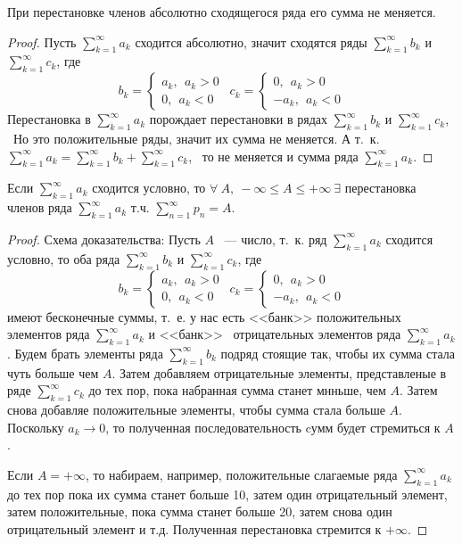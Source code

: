 \documentclass[../../main.tex]{subfiles}
\begin{document}
\begin{crl*}
	При перестановке членов абсолютно сходящегося ряда его сумма не меняется.
\end{crl*}
\begin{proof}
		Пусть $\sum\limits_{k = 1}^{\infty} a_k$ сходится абсолютно,
		значит сходятся ряды $\sum\limits_{k = 1}^{\infty} b_k$ и
		$\sum\limits_{k = 1}^{\infty} c_k$, где\[b_k = \begin{cases}
			a_k, \ \ a_k > 0\\
			0, \ \ a_k < 0
		  \end{cases} \ \
		 c_k = \begin{cases}
			0, \ \ a_k > 0\\
			-a_k, \ \ a_k < 0
		  \end{cases}\]
  Перестановка в $\sum\limits_{k = 1}^{\infty} a_k$ порождает перестановки
  в рядах  $\sum\limits_{k = 1}^{\infty} b_k$ и
  $\sum\limits_{k = 1}^{\infty} c_k$, \ Но это положительные ряды,
  значит их сумма не меняется. А т.~к. $\sum\limits_{k = 1}^{\infty} a_k
   = \sum\limits_{k = 1}^{\infty} b_k + \sum\limits_{k = 1}^{\infty} c_k$,
   \ то не меняется и сумма ряда $\sum\limits_{k = 1}^{\infty} a_k$.
\end{proof}
\begin{thm}
	Если $\sum\limits_{k = 1}^{\infty} a_k$ сходится условно, то
	$\forall \ A, \ - \infty \leq A \leq + \infty \ \exists$
	перестановка членов ряда $\sum\limits_{k = 1}^{\infty} a_k$ т.ч.
	$\sum\limits_{n = 1}^{\infty} p_n = A$.
	\begin{proof}
		Схема доказательства: Пусть $A$ ~--- число, т.~к. ряд
		$\sum\limits_{k = 1}^{\infty} a_k$ сходится условно, то оба ряда
		$\sum\limits_{k = 1}^{\infty} b_k$ и
		$\sum\limits_{k = 1}^{\infty} c_k$, где
		\[b_k = \begin{cases}
			a_k, \ \ a_k > 0\\
			0, \ \ a_k < 0
		  \end{cases} \ \
		 c_k = \begin{cases}
			0, \ \ a_k > 0\\
			-a_k, \ \ a_k < 0
		  \end{cases}\]
		  имеют бесконечные суммы, т.~е. у нас есть <<банк>> положительных
		  элементов	ряда $\sum\limits_{k = 1}^{\infty} a_k$ и <<банк>> \
		  отрицательных элементов ряда $\sum\limits_{k = 1}^{\infty} a_k$.
		  Будем брать элементы ряда $\sum\limits_{k = 1}^{\infty} b_k$
		  подряд стоящие так, чтобы их сумма стала чуть больше чем $A$.
		  Затем добавляем отрицательные элементы, представленые в ряде
		  $\sum\limits_{k = 1}^{\infty} c_k$ до тех пор, пока набранная
		  сумма станет мнньше, чем $A$. Затем снова добавляе положительные
		  элементы, чтобы сумма стала больше $A$. Поскольку $a_k \to 0$,
		  то полученная последовательность cумм будет стремиться к $A$.

		  Если $A = +\infty$, то набираем, например, положительные
		  слагаемые ряда $\sum\limits_{k = 1}^{\infty} a_k$ до тех пор
		  пока их сумма станет больше 10, затем один отрицательный элемент,
		  затем положительные, пока сумма станет больше 20, затем снова один
		  отрицательный элемент и т.д. Полученная перестановка стремится к
		  $+ \infty$.
	\end{proof}
\end{thm}
\end{document}

